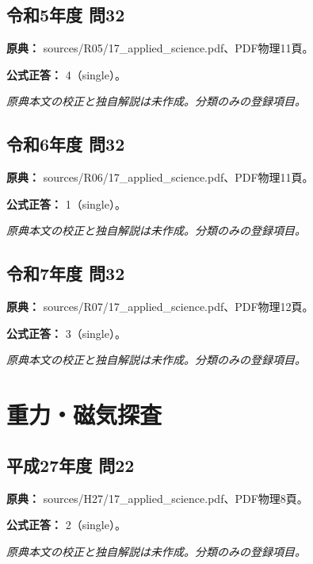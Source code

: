 \subsection{令和5年度 問32}
\label{q:r05-reg-applied-32}

\noindent\textbf{原典：} sources/R05/17\_applied\_science.pdf、PDF物理11頁。

\textbf{公式正答：} 4（single）。

\par\textit{原典本文の校正と独自解説は未作成。分類のみの登録項目。}

\subsection{令和6年度 問32}
\label{q:r06-reg-applied-32}

\noindent\textbf{原典：} sources/R06/17\_applied\_science.pdf、PDF物理11頁。

\textbf{公式正答：} 1（single）。

\par\textit{原典本文の校正と独自解説は未作成。分類のみの登録項目。}

\subsection{令和7年度 問32}
\label{q:r07-reg-applied-32}

\noindent\textbf{原典：} sources/R07/17\_applied\_science.pdf、PDF物理12頁。

\textbf{公式正答：} 3（single）。

\par\textit{原典本文の校正と独自解説は未作成。分類のみの登録項目。}

\section{重力・磁気探査}

\subsection{平成27年度 問22}
\label{q:h27-reg-applied-22}

\noindent\textbf{原典：} sources/H27/17\_applied\_science.pdf、PDF物理8頁。

\textbf{公式正答：} 2（single）。

\par\textit{原典本文の校正と独自解説は未作成。分類のみの登録項目。}

